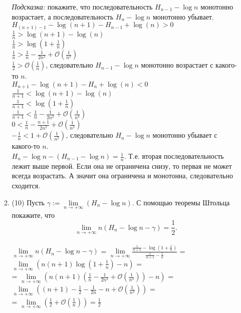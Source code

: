 \documentclass[a4paper]{article}
\begin{document}
\begin{enumerate}
\begin{enumerate}
        \noindent\emph{Подсказка:} покажите, что последовательность $H_{n-1} - \log n$ монотонно возрастает, а последовательность $H_n - \log n$ монотонно убывает.\\
        $H_{(n+1)-1} - \log(n+1) - H_{n-1} + \log(n) > 0$\\
        $\frac{1}{n} > \log(n+1) - \log(n)$\\
        $\frac{1}{n} > \log(1 + \frac{1}{n})$\\
        $\frac{1}{n} > \frac{1}{n} - \frac{1}{2n^2} + \mathcal O(\frac{1}{n^3})$\\
        $\frac{1}{2} > \mathcal O(\frac{1}{n})$, следовательно $H_{n-1} - \log n$ монотонно возрастает с какого-то $n$.\\
        $H_{n+1} - \log(n+1) - H_{n} + \log(n) < 0$\\
        $\frac{1}{n+1} < \log(n+1) - \log(n)$\\
        $\frac{1}{n+1} < \log(1 + \frac{1}{n})$\\
        $\frac{1}{n+1} < \frac{1}{n} - \frac{1}{2n^2} + \mathcal O(\frac{1}{n^3})$\\
        $0 < \frac{1}{n} - \frac{n+1}{2n^2} + \mathcal O(\frac{1}{n^2})$\\
        $- \frac{1}{n} < 1 + \mathcal O(\frac{1}{n^2})$, следовательно $H_{n} - \log n$ монотонно убывает с какого-то $n$.\\
        $H_n - \log n - (H_{n-1} - \log n) = \frac{1}{n}$. Т.е. вторая последовательность лежит выше первой. Если она не ограничена снизу, то первая не может всегда возрастать. А значит она ограничена и монотонна, следовательно сходится.

        \item (10) Пусть $\gamma:= \lim\limits_{n\to +\infty} (H_n - \log n)$. С помощью теоремы Штольца покажите, что
        \[
            \lim\limits_{n\to +\infty}n(H_n - \log n - \gamma) = \frac{1}{2}.
        \]\\
        $\lim\limits_{n\to +\infty}n(H_n - \log n - \gamma)$ = $\lim\limits_{n\to +\infty}\frac{\frac{1}{n+1} - \log (1 + \frac{1}{n})}{\frac{1}{n+1} - \frac{1}{n}}$ = 
        $\lim\limits_{n\to +\infty}(n(n+1)\log (1 + \frac{1}{n}) - n)$ =\\=
        $\lim\limits_{n\to +\infty}(n(n+1)(\frac{1}{n} - \frac{1}{2n^2}+ \mathcal O(\frac{1}{n^3})) - n)$ = 
        $\lim\limits_{n\to +\infty}((n+1) - \frac{1}{2} - \frac{1}{2n} - n + \mathcal O(\frac{1}{n^3}))$ =\\=
        $\lim\limits_{n\to +\infty}(\frac{1}{2} + \mathcal O(\frac{1}{n})) = \frac{1}{2}$


\end{enumerate}
\end{enumerate}
\end{document}
